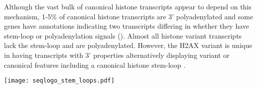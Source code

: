 	Although the vast bulk of canonical histone transcripts appear to depend on this mechanism, 
	1-5\% of canonical histone transcripts are 3' polyadenylated  
	and some genes have annotations indicating two transcripts 
	differing in whether they have stem-loop or polyadenylation signals (). 
	Almost all histone variant transcripts lack the stem-loop and are polyadenylated. 
	However, the H2AX variant is unique in having transcripts with 3' properties alternatively displaying
	variant or canonical features including a canonical histone stem-loop \citep{HTwoAX-transcripts}. 

    \begin{figure*}
      \centering
      \texttt{[image: seqlogo\_stem\_loops.pdf]}
      \label{fig:stem-loop-seqlogo}
    \end{figure*}
